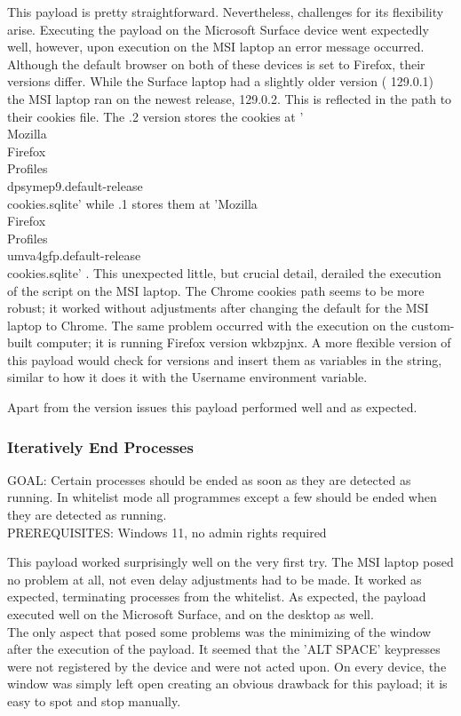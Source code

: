 {This payload is pretty straightforward. Nevertheless, challenges for its flexibility arise. Executing the payload on the Microsoft Surface device went expectedly well, however, upon execution on the MSI laptop an error message occurred. Although the default browser on both of these devices is set to Firefox, their versions differ. While the Surface laptop had a slightly older version ( 129.0.1) the MSI laptop ran on the newest release, 129.0.2. This is reflected in the path to their cookies file. The .2 version stores the cookies at '\\Mozilla\\Firefox\\Profiles\\dpsymep9.default-release\\cookies.sqlite'  while .1 stores them at 'Mozilla\\Firefox\\Profiles\\umva4gfp.default-release\\cookies.sqlite' . This unexpected little, but crucial detail, derailed the execution of the script on the MSI laptop. The Chrome cookies path seems to be more robust; it worked without adjustments after changing the default for the MSI laptop to Chrome. The same problem occurred with the execution on the custom-built computer; it is running Firefox version wkbzpjnx. A more flexible version of this payload would check for versions and insert them as variables in the string, similar to how it does it with the Username environment variable. 

Apart from the version issues this payload performed well and as expected. 


\subsubsection{Iteratively End Processes}



GOAL: Certain processes should be ended as soon as they are detected as running. In whitelist mode all programmes except a few should be ended when they are detected as running.\\
PREREQUISITES: Windows 11, no admin rights required


This payload worked surprisingly well on the very first try. The MSI laptop posed no problem at all, not even delay adjustments had to be made. It worked as expected, terminating processes from the whitelist. As expected, the payload executed well on the Microsoft Surface, and on the desktop as well. \\
The only aspect that posed some problems was the minimizing of the window after the execution of the payload. It seemed that the 'ALT SPACE' keypresses were not registered by the device and were not acted upon. On every device, the window was simply left open creating an obvious drawback for this payload; it is easy to spot and stop manually. 

}
